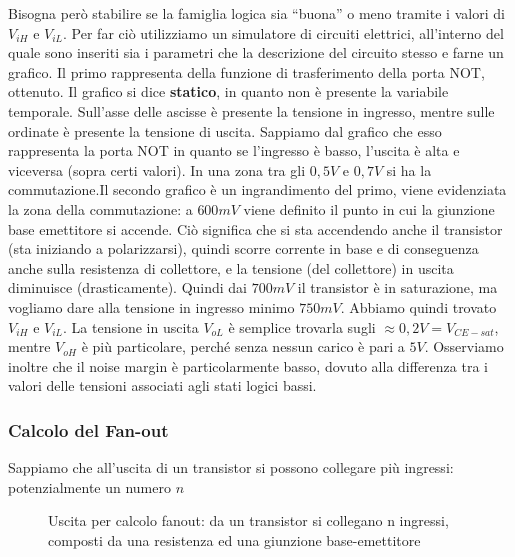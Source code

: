 \documentclass[
]{book}
\begin{document}
Bisogna però stabilire se la famiglia logica sia ``buona'' o meno
tramite i valori di \(V_{iH}\) e \(V_{iL}\). Per far ciò utilizziamo un
simulatore di circuiti elettrici, all'interno del quale sono inseriti
sia i parametri che la descrizione del circuito stesso e farne un
grafico. Il primo rappresenta della funzione di trasferimento della
porta NOT, ottenuto. Il grafico si dice \textbf{statico}, in quanto non
è presente la variabile temporale. Sull'asse delle ascisse è presente la
tensione in ingresso, mentre sulle ordinate è presente la tensione di
uscita. \newline Sappiamo dal grafico che esso rappresenta la porta NOT
in quanto se l'ingresso è basso, l'uscita è alta e viceversa (sopra
certi valori). In una zona tra gli \(0,5V\) e \(0,7V\) si ha la
commutazione.\newline Il secondo grafico è un ingrandimento del primo,
viene evidenziata la zona della commutazione: a \(600mV\) viene definito
il punto in cui la giunzione base emettitore si accende. Ciò significa
che si sta accendendo anche il transistor (sta iniziando a
polarizzarsi), quindi scorre corrente in base e di conseguenza anche
sulla resistenza di collettore, e la tensione (del collettore) in uscita
diminuisce (drasticamente). Quindi dai \(700mV\) il transistor è in
saturazione, ma vogliamo dare alla tensione in ingresso minimo
\(750mV\). Abbiamo quindi trovato \(V_{iH}\) e \(V_{iL}\). La tensione
in uscita \(V_{oL}\) è semplice trovarla sugli
\(\approx 0,2V = V_{CE-sat}\), mentre \(V_{oH}\) è più particolare,
perché senza nessun carico è pari a \(5V\). \newline Osserviamo inoltre
che il noise margin è particolarmente basso, dovuto alla differenza tra
i valori delle tensioni associati agli stati logici bassi.

\subsubsection{Calcolo del Fan-out}\label{calcolo-del-fan-out}

Sappiamo che all'uscita di un transistor si possono collegare più
ingressi: potenzialmente un numero \(n\)

\begin{figure}[H]
    \centering
    \resizebox{0.5\textwidth}{!}{}
    \caption{Uscita per calcolo fanout: da un transistor si collegano n ingressi, composti da una resistenza ed una giunzione base-emettitore}
\end{figure}
\end{document}
